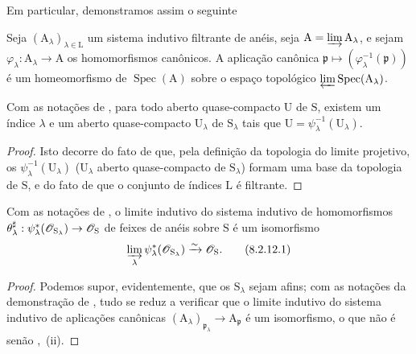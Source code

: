 Em particular, demonstramos assim o seguinte

\begin{corollary}[8.2.10]
\label{IV.8.2.10}
Seja $(\mathrm{A}_\lambda)_{\lambda\in\mathrm{L}}$ um sistema indutivo filtrante de anéis, seja $\mathrm{A}=\varinjlim\mathrm{A}_\lambda$, e sejam $\varphi_\lambda:\mathrm{A}_\lambda\to\mathrm{A}$ os homomorfismos canônicos.
A aplicação canônica $\mathfrak{p}\mapsto(\varphi_\lambda^{-1}(\mathfrak{p}))$ é um homeomorfismo de $\operatorname{Spec}(\mathrm{A})$ sobre o espaço topológico $\varprojlim\operatorname{Spec}(\mathrm{A}_\lambda)$.
\end{corollary}

\begin{corollary}[8.2.11]
\label{IV.8.2.11}
Com as notações de , para todo aberto quase-compacto $\mathrm{U}$ de $\mathrm{S}$, existem um índice $\lambda$ e um aberto quase-compacto $\mathrm{U}_\lambda$ de $\mathrm{S}_\lambda$ tais que $\mathrm{U}=\psi_\lambda^{-1}(\mathrm{U}_\lambda)$.
\end{corollary}

\begin{proof}
Isto decorre do fato de que, pela definição da topologia do limite projetivo, os $\psi_\lambda^{-1}(\mathrm{U}_\lambda)$ ($\mathrm{U}_\lambda$ aberto quase-compacto de $\mathrm{S}_\lambda$) formam uma base da topologia de $\mathrm{S}$, e do fato de que o conjunto de índices $\mathrm{L}$ é filtrante.
\end{proof}

\begin{corollary}[8.2.12]
\label{IV.8.2.12}
Com as notações de , o limite indutivo do sistema indutivo de homomorfismos $\theta_\lambda^\sharp:\psi_\lambda^*(\sh{O}_{\mathrm{S}_\lambda})\to\sh{O}_\mathrm{S}$ de feixes de anéis sobre $\mathrm{S}$ é um isomorfismo
\begin{equation}
  \varinjlim_\lambda\psi_\lambda^*(\sh{O}_{\mathrm{S}_\lambda})\xrightarrow{\sim}\sh{O}_\mathrm{S}.
  \label{IV.8.2.12.1}
\tag{8.2.12.1}
\end{equation}
\end{corollary}

\begin{proof}
Podemos supor, evidentemente, que os $\mathrm{S}_\lambda$ sejam afins; com as notações da demonstração de , tudo se reduz a verificar que o limite indutivo do sistema indutivo de aplicações canônicas $(\mathrm{A}_\lambda)_{\mathfrak{p}_\lambda}\to\mathrm{A}_\mathfrak{p}$ é um isomorfismo, o que não é senão ,~(ii).
\end{proof}

